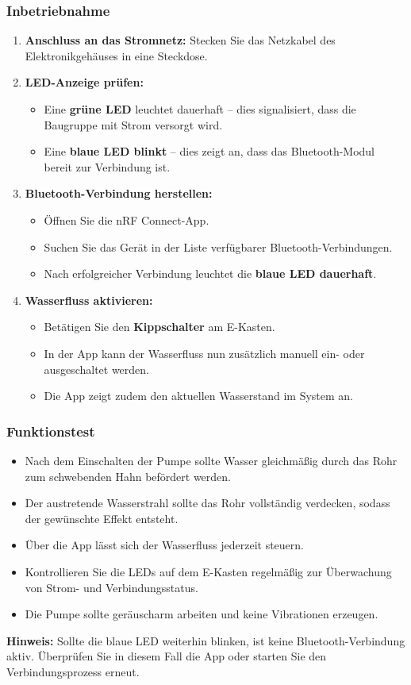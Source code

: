 \subsubsection{Inbetriebnahme}
\begin{enumerate}
	\item \textbf{Anschluss an das Stromnetz:} Stecken Sie das Netzkabel des Elektronikgehäuses in eine Steckdose.
	\item \textbf{LED-Anzeige prüfen:}
	\begin{itemize}
		\item Eine \textbf{grüne LED} leuchtet dauerhaft – dies signalisiert, dass die Baugruppe mit Strom versorgt wird.
		\item Eine \textbf{blaue LED blinkt} – dies zeigt an, dass das Bluetooth-Modul bereit zur Verbindung ist.
	\end{itemize}
	\item \textbf{Bluetooth-Verbindung herstellen:}
	\begin{itemize}
		\item Öffnen Sie die nRF Connect-App.
		\item Suchen Sie das Gerät in der Liste verfügbarer Bluetooth-Verbindungen.
		\item Nach erfolgreicher Verbindung leuchtet die \textbf{blaue LED dauerhaft}.
	\end{itemize}
	\item \textbf{Wasserfluss aktivieren:}
	\begin{itemize}
		\item Betätigen Sie den \textbf{Kippschalter} am E-Kasten.
		\item In der App kann der Wasserfluss nun zusätzlich manuell ein- oder ausgeschaltet werden.
		\item Die App zeigt zudem den aktuellen Wasserstand im System an.
	\end{itemize}
\end{enumerate}

\subsubsection{Funktionstest}
\begin{itemize}
	\item Nach dem Einschalten der Pumpe sollte Wasser gleichmäßig durch das Rohr zum schwebenden Hahn befördert werden.
	\item Der austretende Wasserstrahl sollte das Rohr vollständig verdecken, sodass der gewünschte Effekt entsteht.
	\item Über die App lässt sich der Wasserfluss jederzeit steuern.
	\item Kontrollieren Sie die LEDs auf dem E-Kasten regelmäßig zur Überwachung von Strom- und Verbindungsstatus.
	\item Die Pumpe sollte geräuscharm arbeiten und keine Vibrationen erzeugen.
\end{itemize}

\textbf{Hinweis:} Sollte die blaue LED weiterhin blinken, ist keine Bluetooth-Verbindung aktiv. Überprüfen Sie in diesem Fall die App oder starten Sie den Verbindungsprozess erneut.